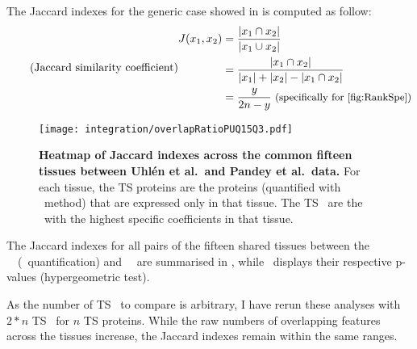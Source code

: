 \begin{minipage}{\textwidth}
    The Jaccard indexes for the generic case showed in 
    is computed as follow:
\begin{equation}
    \tag{Jaccard similarity coefficient}\label{eq:Jaccard}
    \begin{split}
        J(x_{1},x_{2}) & = \frac{\left | x_{1}\cap  x_{2}\right |}%
                                {\left | x_{1}\cup  x_{2}\right |}\\
                       & = \frac{\left | x_{1}\cap  x_{2}\right |}%
                                {\left | x_{1} \right | + \left | x_{2} \right |%
                                - \left | x_{1}\cap  x_{2}\right |}\\
                                & = \frac{y}{2n-y} \text{\small{~(specifically
                                for~\Cref{fig:RankSpe})}}\\
    \end{split}
    \raisetag{6cm}
\end{equation}
\end{minipage}


\begin{figure}[!htb]
    \texttt{[image: integration/overlapRatioPUQ15Q3.pdf]}\centering
    \vspace{-2mm}
\caption[Heatmap of Jaccard indexes across 15 tissues]{%
\label{fig:JaccardIndexes}\label{fig:RatioJac}\textbf{Heatmap of Jaccard indexes
across the common fifteen tissues between Uhlén et al.\ and Pandey et al.\ data.}
For each tissue, the \gls{TS} proteins are the proteins
(quantified with \PPKM\ method) that are expressed only in that tissue.
The \gls{TS} \mRNAs\ are the \mRNAs\ with the highest specific coefficients
in that tissue.}
\vspace{-4mm}
\end{figure}

The Jaccard indexes for all pairs of the fifteen shared tissues
between the \pandey\ \etal\ (\PPKM\ quantification) and \uhlen\ \etal\
are summarised in ,
while~ displays
their respective p-values (hypergeometric test).\\
\vspace{-\baselineskip}


As the number of \gls{TS} \mRNAs\ to compare is arbitrary,
I have rerun these analyses with $2*n$ \gls{TS} \mRNAs\ for $n$ \gls{TS} proteins.
While the raw numbers of overlapping features across the tissues increase,
the Jaccard indexes remain within the same ranges.

